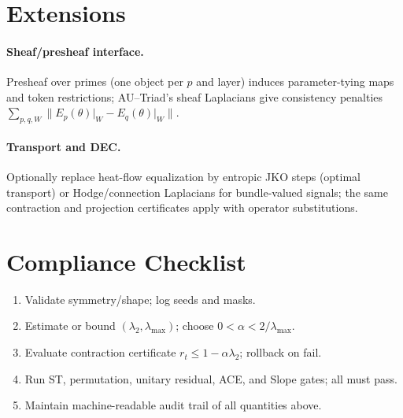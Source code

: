 \documentclass[11pt]{article}
\begin{document}
\section{Extensions}
\paragraph{Sheaf/presheaf interface.}
Presheaf over primes (one object per $p$ and layer) induces parameter-tying maps and token restrictions; AU--Triad's sheaf Laplacians give consistency penalties $\sum\limits_{p,q,W}\big\lVert E_p(\theta)\rvert_W - E_q(\theta)\rvert_W\big\rVert$.

\paragraph{Transport and DEC.}
Optionally replace heat-flow equalization by entropic JKO steps (optimal transport) or Hodge/connection Laplacians for bundle-valued signals; the same contraction and projection certificates apply with operator substitutions.

\section{Compliance Checklist}
\begin{enumerate}[leftmargin=2em,label=(\alph*)]
\item Validate symmetry/shape; log seeds and masks.
\item Estimate or bound $(\lambda_2,\lambda_{\max})$; choose $0<\alpha<2/\lambda_{\max}$.
\item Evaluate contraction certificate $r_t\le 1-\alpha\lambda_2$; rollback on fail.
\item Run ST, permutation, unitary residual, ACE, and Slope gates; all must pass.
\item Maintain machine-readable audit trail of all quantities above.
\end{enumerate}
\end{document}
